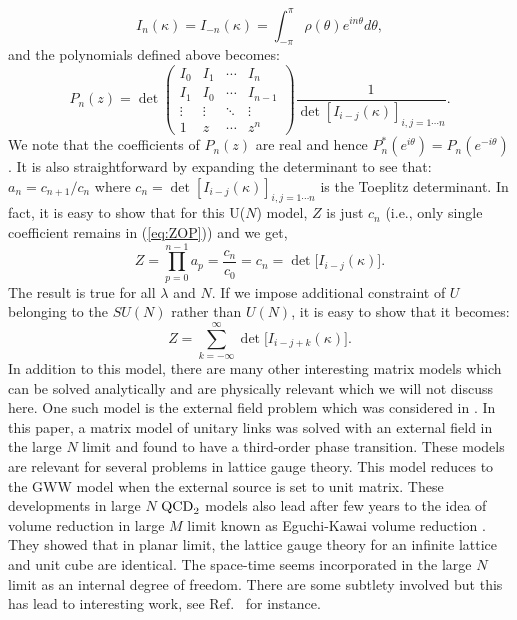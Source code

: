 \documentclass[letter,11pt]{article}
\begin{document}
\begin{equation}
	I_{n}(\kappa) = I_{-n}(\kappa) = \int_{-\pi}^{\pi} \rho(\theta) e^{i n \theta}d\theta, 
\end{equation}
and the polynomials defined above becomes:
\begin{equation}
	P_{n}(z) = \det
	\begin{pmatrix}
		I_0 & I_1 & \cdots & I_n \\
		I_1 & I_0 & \cdots & I_{n-1} \\
		\vdots  & \vdots  & \ddots & \vdots  \\
		1 & z & \cdots & z^n 
			\end{pmatrix}
		 \frac{1}{\det [I_{i-j} (\kappa)]_{i,j = 1 \cdots n}}. 
\end{equation}
We note that the coefficients of $P_{n}(z)$ are real and hence $P_{n}^{*}(e^{i\theta}) = P_{n}(e^{-i\theta})$. It is also straightforward by expanding the determinant to see that: $a_{n} = c_{n+1}/c_{n}$ where $c_{n} = \det [I_{i-j}(\kappa)]_{i,j = 1 \cdots n}$ is the Toeplitz determinant. 
In fact, it is easy to show that for this U($N$) model, $Z$ is just $c_{n}$ (i.e., only single coefficient remains in (\ref{eq:ZOP})) and we get, 
\begin{equation}
\label{eq:GWW_ex} 
Z = \prod_{p=0}^{n-1} a_{p} = \frac{c_n}{c_0} = c_{n} = \det \Big[I_{i-j}(\kappa) \Big].
\end{equation}
The result is true for all $\lambda$ and $N$. If we impose additional constraint of 
$U$ belonging to the $SU(N)$ rather than $U(N)$, it is easy to show that
it becomes:
\begin{equation}
\label{eq:GWW_ex} 
Z = \sum_{k=-\infty}^{\infty} \det \Big[I_{i-j+k}(\kappa) \Big].
\end{equation}
In addition to this model, there are many other interesting matrix models which can be solved analytically
and are physically relevant which we will not discuss here. 
One such model is the external field problem which was considered in \cite{Brezin:1980rk}. In this paper, a matrix 
model of unitary links was solved with an external field in the large $N$ limit and found to have a third-order phase transition. These models are relevant for several problems in lattice gauge theory. This model reduces to the GWW model when the external source is set to unit matrix. These developments in large $N$ $\rm{QCD}_{2}$ models also lead after few years to the idea of volume reduction in large $M$ limit known as Eguchi-Kawai volume reduction \cite{Eguchi:1982nm}. They showed that in planar limit, the lattice gauge theory for an infinite lattice and unit cube are identical. The space-time seems incorporated in the large $N$ limit as an internal degree of freedom. There are some subtlety involved but this has lead to interesting work, see Ref.~\cite{Kovtun:2007py} for instance. 
\end{document}
